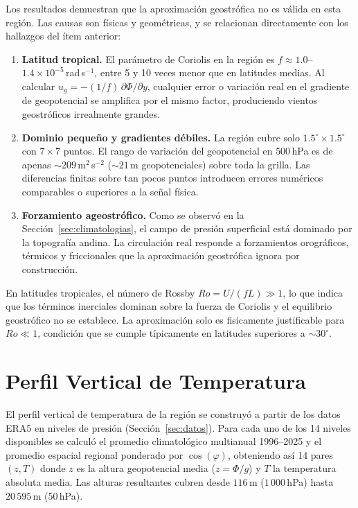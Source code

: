 \documentclass[12pt, a4paper]{article}
\begin{document}
Los resultados demuestran que la aproximación geostrófica
no es válida en esta región. Las causas son físicas y
geométricas, y se relacionan directamente con los hallazgos
del ítem anterior:

\begin{enumerate}
	\item \textbf{Latitud tropical.} El parámetro de Coriolis
	en la región es $f \approx 1.0$--$1.4 \times 10^{-5}$\,rad\,s$^{-1}$,
	entre 5 y 10 veces menor que en latitudes medias. Al
	calcular $u_g = -(1/f)\,\partial\Phi/\partial y$, cualquier
	error o variación real en el gradiente de geopotencial
	se amplifica por el mismo factor, produciendo vientos
	geostróficos irrealmente grandes.
	
	\item \textbf{Dominio pequeño y gradientes débiles.}
	La región cubre solo $1.5^{\circ} \times 1.5^{\circ}$
	con $7 \times 7$ puntos. El rango de variación del
	geopotencial en $500$\,hPa es de apenas $\sim\!209$\,m$^2$\,s$^{-2}$
	($\sim\!21$\,m geopotenciales) sobre toda la grilla.
	Las diferencias finitas sobre tan pocos puntos introducen
	errores numéricos comparables o superiores a la señal física.
	
	\item \textbf{Forzamiento ageostrófico.} Como se observó
	en la Sección~\ref{sec:climatologias}, el campo de presión
	superficial está dominado por la topografía andina. La
	circulación real responde a forzamientos orográficos,
	térmicos y friccionales que la aproximación geostrófica
	ignora por construcción.
\end{enumerate}

En latitudes tropicales, el número de Rossby
$Ro = U/(fL) \gg 1$, lo que indica que los términos
inerciales dominan sobre la fuerza de Coriolis y el
equilibrio geostrófico no se establece. La aproximación
solo es fisicamente justificable para $Ro \ll 1$, condición
que se cumple típicamente en latitudes superiores a
$\sim\!30^{\circ}$.

\section{Perfil Vertical de Temperatura}
\label{sec:perfil}

El perfil vertical de temperatura de la región se construyó a
partir de los datos ERA5 en niveles de presión (Sección~\ref{sec:datos}).
Para cada uno de los 14 niveles disponibles se calculó el
promedio climatológico multianual 1996--2025 y el promedio
espacial regional ponderado por $\cos(\varphi)$, obteniendo
así 14 pares $(z, T)$ donde $z$ es la altura geopotencial
media ($z = \Phi/g$) y $T$ la temperatura absoluta media.
Las alturas resultantes cubren desde $116$\,m ($1\,000$\,hPa)
hasta $20\,595$\,m ($50$\,hPa).
\end{document}
